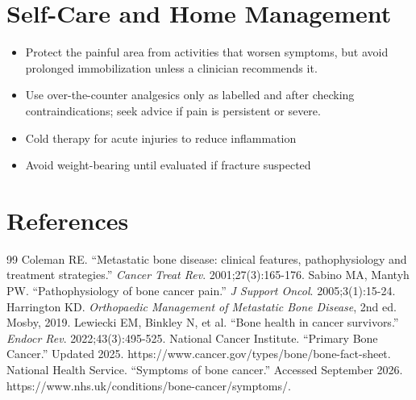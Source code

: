 \section*{Self-Care and Home Management}
\begin{itemize}
 \item Protect the painful area from activities that worsen symptoms, but avoid prolonged immobilization unless a clinician recommends it.
 \item Use over-the-counter analgesics only as labelled and after checking contraindications; seek advice if pain is persistent or severe.
 \item Cold therapy for acute injuries to reduce inflammation
 \item Avoid weight-bearing until evaluated if fracture suspected
\end{itemize}

\section*{References}
\begin{thebibliography}{99}
 Coleman RE. ``Metastatic bone disease: clinical features, pathophysiology and treatment strategies.'' \textit{Cancer Treat Rev}. 2001;27(3):165-176.
 Sabino MA, Mantyh PW. ``Pathophysiology of bone cancer pain.'' \textit{J Support Oncol}. 2005;3(1):15-24.
 Harrington KD. \textit{Orthopaedic Management of Metastatic Bone Disease}, 2nd ed. Mosby, 2019.
 Lewiecki EM, Binkley N, et al. ``Bone health in cancer survivors.'' \textit{Endocr Rev}. 2022;43(3):495-525.
 National Cancer Institute. ``Primary Bone Cancer.'' Updated 2025. https://www.cancer.gov/types/bone/bone-fact-sheet.
 National Health Service. ``Symptoms of bone cancer.'' Accessed September 2026. https://www.nhs.uk/conditions/bone-cancer/symptoms/.
\end{thebibliography}
